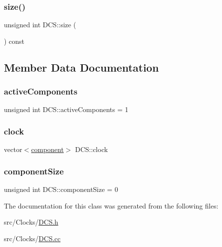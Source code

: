 \mbox{\label{classDCS_ac428129bbebba59be9a09c09c1096323}} 
\subsubsection{\texorpdfstring{size()}{size()}}
{\footnotesize\ttfamily unsigned int D\+C\+S\+::size (\begin{DoxyParamCaption}{ }\end{DoxyParamCaption}) const}



\subsection{Member Data Documentation}
\mbox{\label{classDCS_a0922c1733e23bf6098b71890da57e762}} 
\subsubsection{\texorpdfstring{active\+Components}{activeComponents}}
{\footnotesize\ttfamily unsigned int D\+C\+S\+::active\+Components = 1}

\mbox{\label{classDCS_adde0f06e934657f25a92b13e04d3fd7d}} 
\subsubsection{\texorpdfstring{clock}{clock}}
{\footnotesize\ttfamily vector$<$\hyperlink{DCS_8h_aff5561f7728e7d2c203fbfeac4a73866}{component}$>$ D\+C\+S\+::clock}

\mbox{\label{classDCS_af256dc5d9b30241bfce2e12d57824bec}} 
\subsubsection{\texorpdfstring{component\+Size}{componentSize}}
{\footnotesize\ttfamily unsigned int D\+C\+S\+::component\+Size = 0}



The documentation for this class was generated from the following files\+:\begin{DoxyCompactItemize}
\item 
src/\+Clocks/\hyperlink{DCS_8h}{D\+C\+S.\+h}\item 
src/\+Clocks/\hyperlink{DCS_8cc}{D\+C\+S.\+cc}\end{DoxyCompactItemize}
